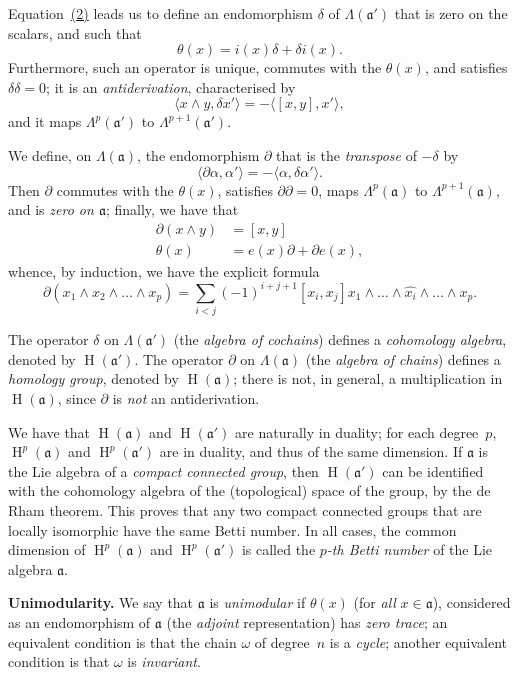 \documentclass{article}
\newcommand{\fk}{\mathfrak}
\DeclareMathOperator{\HH}{H}
\newcommand{\oldpage}[1]{\marginpar{\footnotesize$\Big\vert$ \textit{p.~#1}}}
\begin{document}
Equation~\hyperref[equation-I.2]{(2)} leads us to define an endomorphism $\delta$ of $\Lambda(\fk{a}')$ that is zero on the scalars, and such that
\[
\label{equation-I.4}
  \theta(x) = i(x)\delta + \delta i(x).
\tag{4}
\]
Furthermore, such an operator is unique, commutes with the $\theta(x)$, and satisfies $\delta\delta=0$;
it is an \emph{antiderivation}, characterised by
\[
  \langle x\wedge y,\delta x'\rangle
  = -\langle[x,y],x'\rangle,
\]
and it maps $\Lambda^p(\fk{a}')$ to $\Lambda^{p+1}(\fk{a}')$.

We define, on $\Lambda(\fk{a})$, the endomorphism $\partial$ that is the \emph{transpose} of $-\delta$ by
\[
  \langle\partial\alpha,\alpha'\rangle
  = -\langle\alpha,\delta\alpha'\rangle.
\]
Then $\partial$ commutes with the $\theta(x)$, satisfies $\partial\partial=0$, maps $\Lambda^p(\fk{a})$ to $\Lambda^{p+1}(\fk{a})$, and is \emph{zero on $\fk{a}$};
finally, we have that
\[
  \begin{aligned}
    \partial(x\wedge y)
    &= [x,y]
  \\\theta(x)
    &= e(x)\partial + \partial e(x),
  \end{aligned}
\]
whence, by induction, we have the explicit formula
\[
  \partial(x_1\wedge x_2\wedge\ldots\wedge x_p)
  = \sum_{i<j} (-1)^{i+j+1} [x_i,x_j] x_1\wedge\ldots\wedge\widehat{x_i}\wedge\ldots\wedge x_p.
\]

The operator $\delta$ on $\Lambda(\fk{a}')$ (the \emph{algebra of cochains}) defines a \emph{cohomology algebra}, denoted by $\HH(\fk{a}')$.
The operator $\partial$ on $\Lambda(\fk{a})$ (the \emph{algebra of chains}) defines a \emph{homology group}, denoted by $\HH(\fk{a})$;
there is not, in general, a multiplication in $\HH(\fk{a})$, since $\partial$ is \emph{not} an antiderivation.

We have that $\HH(\fk{a})$ and $\HH(\fk{a}')$ are naturally in duality;
for each degree~$p$, $\HH^p(\fk{a})$ and $\HH^p(\fk{a}')$ are in duality, and thus of the same dimension.
If $\fk{a}$ is the Lie algebra of a \emph{compact connected group}, then $\HH(\fk{a}')$ can be identified with the cohomology algebra of the (topological) space of the group, by the de Rham theorem.
This proves that
\oldpage{12}
any two compact connected groups that are locally isomorphic have the same Betti number.
In all cases, the common dimension of $\HH^p(\fk{a})$ and $\HH^p(\fk{a}')$ is called the \emph{$p$-th Betti number} of the Lie algebra $\fk{a}$.

\medskip
\textbf{Unimodularity.}
We say that $\fk{a}$ is \emph{unimodular} if $\theta(x)$ (for \emph{all} $x\in\fk{a}$), considered as an endomorphism of $\fk{a}$ (the \emph{adjoint} representation) has \emph{zero trace};
an equivalent condition is that the chain $\omega$ of degree~$n$ is a \emph{cycle};
another equivalent condition is that $\omega$ is \emph{invariant}.
\end{document}
